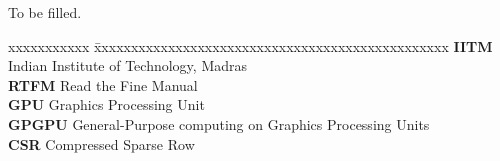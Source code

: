 \documentclass[MTech]{iitmdiss}
\begin{document}
\vspace*{24pt}

\noindent To be filled. 

\pagebreak


\begin{singlespace}
\tableofcontents
\thispagestyle{empty}

\listoftables
{}
\listoffigures
{}
\end{singlespace}


\abbreviations

\noindent 
\begin{tabbing}
xxxxxxxxxxx \= xxxxxxxxxxxxxxxxxxxxxxxxxxxxxxxxxxxxxxxxxxxxxxxx \kill
\textbf{IITM}   \> Indian Institute of Technology, Madras \\
\textbf{RTFM} \> Read the Fine Manual \\
\textbf{GPU} \> Graphics Processing Unit \\
\textbf{GPGPU} \> General-Purpose computing on Graphics Processing Units  \\
\textbf{CSR} \> Compressed Sparse Row \\

\end{tabbing}

\pagebreak


%
%
\clearpage
\end{document}
